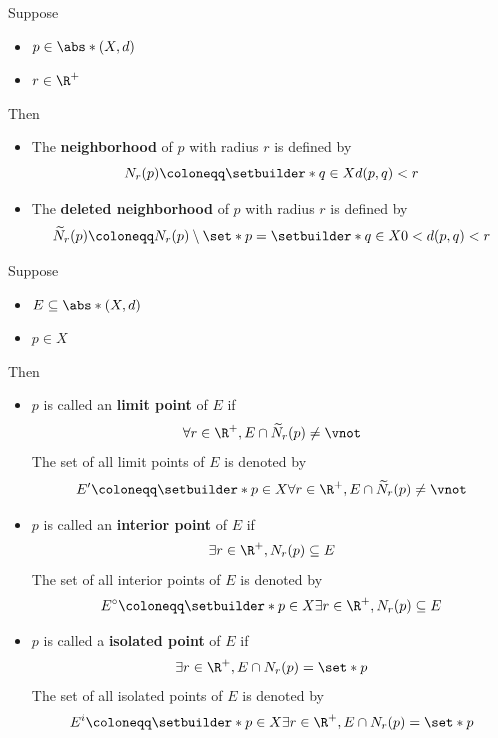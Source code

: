 \begin{definition} \label{an1:def:neighborhood-open-ball}
  Suppose
  \begin{itemize}
    \item $p \in \abs*{(X, d)}$
    \item $r \in \R^{+}$
  \end{itemize}
  Then
  \begin{itemize}
    \item The \textbf{neighborhood} of $p$ with radius $r$ is defined by
          \[
            N_{r}(p) \coloneqq \setbuilder*{q \in X}{d(p, q) < r}
          \]
    \item The \textbf{deleted neighborhood} of $p$ with radius $r$ is defined by
          \[
            \widetilde{N}_{r}(p) \coloneqq N_{r}(p) \setminus \set*{p}
            = \setbuilder*{q \in X}{0 < d(p, q) < r}
          \]
  \end{itemize}
\end{definition}

\begin{definition} \label{an1:def:limit-interior-isolated-points}
  Suppose
  \begin{itemize}
    \item $E \subseteq \abs*{(X, d)}$
    \item $p \in X$
  \end{itemize}
  Then
  \begin{itemize}
    \item $p$ is called an \textbf{limit point} of $E$ if
          \[
            \forall r \in \R^{+}, E \cap \widetilde{N}_{r}(p) \neq \vnot
          \]
          The set of all limit points of $E$ is denoted by
          \[
            E' \coloneqq \setbuilder*{p \in X}{\forall r \in \R^{+}, E \cap \widetilde{N}_{r}(p) \neq \vnot}
          \]
    \item $p$ is called an \textbf{interior point} of $E$ if
          \[
            \exists r \in \R^{+}, N_{r}(p) \subseteq E
          \]
          The set of all interior points of $E$ is denoted by
          \[
            E^{\circ} \coloneqq \setbuilder*{p \in X}{\exists r \in \R^{+}, N_{r}(p) \subseteq E}
          \]
    \item $p$ is called a \textbf{isolated point} of $E$ if
          \[
            \exists r \in \R^{+}, E \cap N_{r}(p) = \set*{p}
          \]
          The set of all isolated points of $E$ is denoted by
          \[
            E^{i} \coloneqq \setbuilder*{p \in X}{\exists r \in \R^{+}, E \cap N_{r}(p) = \set*{p}}
          \]
  \end{itemize}
\end{definition}

